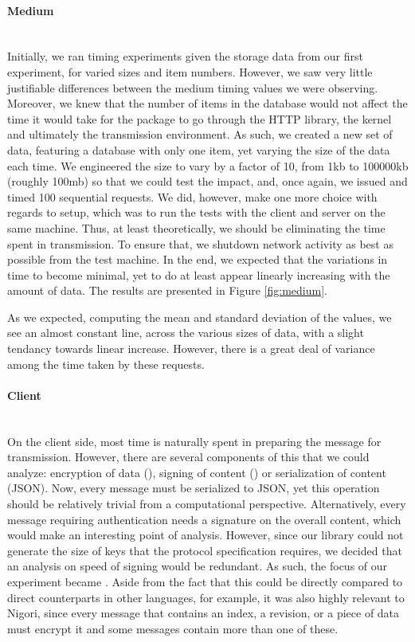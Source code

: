 \paragraph{Medium} ~\\
Initially, we ran timing experiments given the storage data from our first experiment, for varied sizes and item numbers.
However, we saw very little justifiable differences between the medium timing values we were observing.
Moreover, we knew that the number of items in the database would not affect the time it would take for the package to go through the HTTP library, the kernel and ultimately the transmission environment.
As such, we created a new set of data, featuring a database with only one item, yet varying the size of the data each time.
We engineered the size to vary by a factor of 10, from 1kb to 100000kb (roughly 100mb) so that we could test the impact, and, once again, we issued and timed 100 sequential  requests.
We did, however, make one more choice with regards to setup, which was to run the tests with the client and server on the same machine.
Thus, at least theoretically, we should be eliminating the time spent in transmission.
To ensure that, we shutdown network activity as best as possible from the test machine.
In the end, we expected that the variations in time to become minimal, yet to do at least appear linearly increasing with the amount of data.
The results are presented in Figure \ref{fig:medium}.


As we expected, computing the mean and standard deviation of the values, we see an almost constant line, across the various sizes of data, with a slight tendancy towards linear increase.
However, there is a great deal of variance among the time taken by these requests.

\paragraph{Client} ~\\
On the client side, most time is naturally spent in preparing the message for transmission.
However, there are several components of this that we could analyze: encryption of data (), signing of content () or serialization of content (JSON).
Now, every message must be serialized to JSON, yet this operation should be relatively trivial from a computational perspective.
Alternatively, every message requiring authentication needs a signature on the overall content, which would make  an interesting point of analysis.
However, since our library could not generate the size of keys that the protocol specification requires, we decided that an analysis on speed of signing would be redundant.
As such, the focus of our experiment became .
Aside from the fact that this could be directly compared to direct counterparts in other languages, for example, it was also highly relevant to Nigori, since every message that contains an index, a revision, or a piece of data must encrypt it and some messages contain more than one of these.


